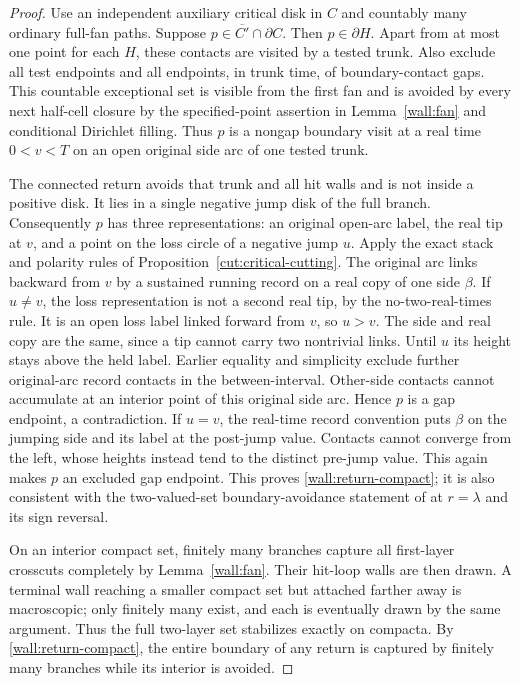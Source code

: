 \begin{proof}
Use an independent auxiliary critical disk in $C$ and countably many ordinary full-fan paths.  Suppose $p\in\overline{C'}\cap\partial C$.  Then $p\in\partial H$.  Apart from at most one point for each $H$, these contacts are visited by a tested trunk.  Also exclude all test endpoints and all endpoints, in trunk time, of boundary-contact gaps.  This countable exceptional set is visible from the first fan and is avoided by every next half-cell closure by the specified-point assertion in Lemma~\ref{wall:fan} and conditional Dirichlet filling.  Thus $p$ is a nongap boundary visit at a real time $0<v<T$ on an open original side arc of one tested trunk.

The connected return avoids that trunk and all hit walls and is not inside a positive disk.  It lies in a single negative jump disk of the full branch.  Consequently $p$ has three representations: an original open-arc label, the real tip at $v$, and a point on the loss circle of a negative jump $u$.  Apply the exact stack and polarity rules of Proposition~\ref{cut:critical-cutting}.  The original arc links backward from $v$ by a sustained running record on a real copy of one side $\beta$.  If $u\ne v$, the loss representation is not a second real tip, by the no-two-real-times rule.  It is an open loss label linked forward from $v$, so $u>v$.  The side and real copy are the same, since a tip cannot carry two nontrivial links.  Until $u$ its height stays above the held label.  Earlier equality and simplicity exclude further original-arc record contacts in the between-interval.  Other-side contacts cannot accumulate at an interior point of this original side arc.  Hence $p$ is a gap endpoint, a contradiction.  If $u=v$, the real-time record convention puts $\beta$ on the jumping side and its label at the post-jump value.  Contacts cannot converge from the left, whose heights instead tend to the distinct pre-jump value.  This again makes $p$ an excluded gap endpoint.  This proves \eqref{wall:return-compact}; it is also consistent with the two-valued-set boundary-avoidance statement of \cite[Lemma~6.11]{ASlocal} at $r=\lambda$ and its sign reversal.

On an interior compact set, finitely many branches capture all first-layer crosscuts completely by Lemma~\ref{wall:fan}.  Their hit-loop walls are then drawn.  A terminal wall reaching a smaller compact set but attached farther away is macroscopic; only finitely many exist, and each is eventually drawn by the same argument.  Thus the full two-layer set stabilizes exactly on compacta.  By \eqref{wall:return-compact}, the entire boundary of any return is captured by finitely many branches while its interior is avoided.


\end{proof}
